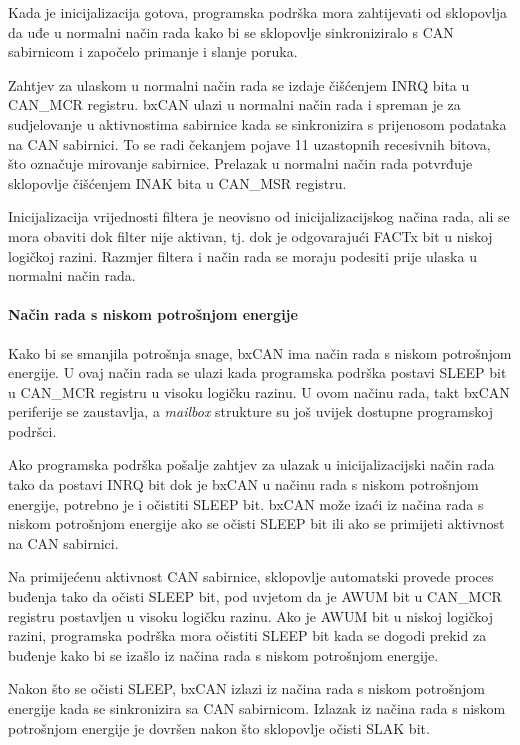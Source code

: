 Kada je inicijalizacija gotova, programska podrška mora zahtijevati od sklopovlja da uđe u normalni način rada kako bi se sklopovlje sinkroniziralo s CAN sabirnicom i započelo primanje i slanje poruka.

Zahtjev za ulaskom u normalni način rada se izdaje čišćenjem INRQ bita u CAN\_MCR registru. bxCAN ulazi u normalni način rada i spreman je za sudjelovanje u aktivnostima sabirnice kada se sinkronizira s prijenosom podataka na CAN sabirnici. To se radi čekanjem pojave 11 uzastopnih recesivnih bitova, što označuje mirovanje sabirnice. Prelazak u normalni način rada potvrđuje sklopovlje čišćenjem INAK bita u CAN\_MSR registru.

Inicijalizacija vrijednosti filtera je neovisno od inicijalizacijskog načina rada, ali se mora obaviti dok filter nije aktivan, tj. dok je odgovarajući FACTx bit u niskoj logičkoj razini. Razmjer filtera i način rada se moraju podesiti prije ulaska u normalni način rada.

\paragraph{Način rada s niskom potrošnjom energije }

Kako bi se smanjila potrošnja snage, bxCAN ima način rada s niskom potrošnjom energije. U ovaj način rada se ulazi kada programska podrška postavi SLEEP bit u CAN\_MCR registru u visoku logičku razinu. U ovom načinu rada, takt bxCAN periferije se zaustavlja, a \textit{mailbox} strukture su još uvijek dostupne programskoj podršci.

Ako programska podrška pošalje zahtjev za ulazak u inicijalizacijski način rada tako da postavi INRQ bit dok je bxCAN u načinu rada s niskom potrošnjom energije, potrebno je i očistiti SLEEP bit. bxCAN može izaći iz načina rada s niskom potrošnjom energije ako se očisti SLEEP bit ili ako se primijeti aktivnost na CAN sabirnici.

Na primijećenu aktivnost CAN sabirnice, sklopovlje automatski provede proces buđenja tako da očisti SLEEP bit, pod uvjetom da je AWUM bit u CAN\_MCR registru postavljen u visoku logičku razinu. Ako je AWUM bit u niskoj logičkoj razini, programska podrška mora očistiti SLEEP bit kada se dogodi prekid za buđenje kako bi se izašlo iz načina rada s niskom potrošnjom energije.

Nakon što se očisti SLEEP, bxCAN izlazi iz načina rada s niskom potrošnjom energije kada se sinkronizira sa CAN sabirnicom. Izlazak iz načina rada s niskom potrošnjom energije je dovršen nakon što sklopovlje očisti SLAK bit.


